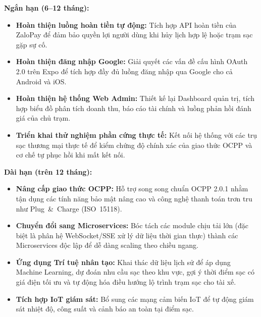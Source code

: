 \textbf{Ngắn hạn (6--12 tháng):}
\begin{itemize}
    \item \textbf{Hoàn thiện luồng hoàn tiền tự động:} Tích hợp API hoàn tiền của ZaloPay để đảm bảo quyền lợi người dùng khi hủy lịch hợp lệ hoặc trạm sạc gặp sự cố.
    \item \textbf{Hoàn thiện đăng nhập Google:} Giải quyết các vấn đề cấu hình OAuth 2.0 trên Expo để tích hợp đầy đủ luồng đăng nhập qua Google cho cả Android và iOS.
    \item \textbf{Hoàn thiện hệ thống Web Admin:} Thiết kế lại Dashboard quản trị, tích hợp biểu đồ phân tích doanh thu, báo cáo tài chính và luồng phản hồi đánh giá của chủ trạm.
    \item \textbf{Triển khai thử nghiệm phần cứng thực tế:} Kết nối hệ thống với các trụ sạc thương mại thực tế để kiểm chứng độ chính xác của giao thức OCPP và cơ chế tự phục hồi khi mất kết nối.
\end{itemize}

\textbf{Dài hạn (trên 12 tháng):}
\begin{itemize}
    \item \textbf{Nâng cấp giao thức OCPP:} Hỗ trợ song song chuẩn OCPP 2.0.1 nhằm tận dụng các tính năng bảo mật nâng cao và công nghệ thanh toán trơn tru như Plug~\&~Charge (ISO~15118).
    \item \textbf{Chuyển đổi sang Microservices:} Bóc tách các module chịu tải lớn (đặc biệt là phân hệ WebSocket/SSE xử lý dữ liệu thời gian thực) thành các Microservices độc lập để dễ dàng scaling theo chiều ngang.
    \item \textbf{Ứng dụng Trí tuệ nhân tạo:} Khai thác dữ liệu lịch sử để áp dụng Machine Learning, dự đoán nhu cầu sạc theo khu vực, gợi ý thời điểm sạc có giá điện tối ưu và tự động hóa điều hướng lộ trình trạm sạc cho tài xế.
    \item \textbf{Tích hợp IoT giám sát:} Bổ sung các mạng cảm biến IoT để tự động giám sát nhiệt độ, công suất và cảnh báo an toàn tại điểm sạc.
\end{itemize}
